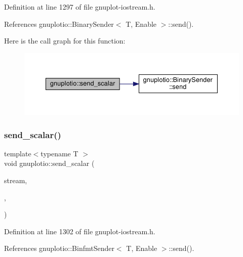 Definition at line 1297 of file gnuplot-\/iostream.\+h.



References gnuplotio\+::\+Binary\+Sender$<$ T, Enable $>$\+::send().

Here is the call graph for this function\+:\nopagebreak
\begin{figure}[H]
\begin{center}
\leavevmode
\includegraphics[width=350pt]{namespacegnuplotio_a05022d6e136d8ed89a2bef0f61443332_cgraph}
\end{center}
\end{figure}
\mbox{\label{namespacegnuplotio_a926e0935a02d83735da2c34cfbad133f}} 
\subsubsection{\texorpdfstring{send\+\_\+scalar()}{send\_scalar()}\hspace{0.1cm}{\footnotesize\ttfamily [3/3]}}
{\footnotesize\ttfamily template$<$typename T $>$ \\
void gnuplotio\+::send\+\_\+scalar (\begin{DoxyParamCaption}\item[{std\+::ostream \&}]{stream,  }\item[{const T \&}]{,  }\item[{\hyperlink{structgnuplotio_1_1_mode_binfmt}{Mode\+Binfmt}}]{ }\end{DoxyParamCaption})}



Definition at line 1302 of file gnuplot-\/iostream.\+h.



References gnuplotio\+::\+Binfmt\+Sender$<$ T, Enable $>$\+::send().

